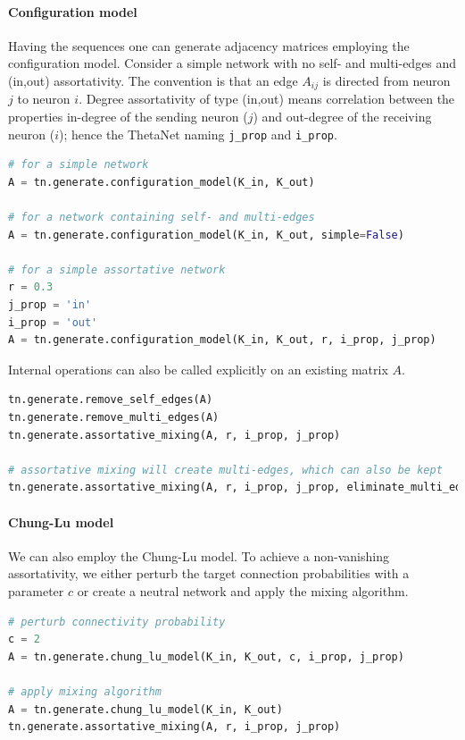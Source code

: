 \documentclass[bibliography=totoc, twoside]{article}
\numberwithin{equation}{section}
\begin{document}
\paragraph*{Configuration model}
Having the sequences one can generate adjacency matrices employing the configuration model.
Consider a simple network with no self- and multi-edges and (in,out) assortativity.
The convention is that an edge $A_{ij}$ is directed from neuron $j$ to neuron $i$.
Degree assortativity of type (in,out) means correlation between the properties in-degree of the sending neuron ($j$) and out-degree of the receiving neuron ($i$);
hence the ThetaNet naming \texttt{j\_prop} and \texttt{i\_prop}.
\begin{lstlisting}[language=python]
# for a simple network
A = tn.generate.configuration_model(K_in, K_out)

# for a network containing self- and multi-edges
A = tn.generate.configuration_model(K_in, K_out, simple=False)

# for a simple assortative network
r = 0.3
j_prop = 'in'
i_prop = 'out'
A = tn.generate.configuration_model(K_in, K_out, r, i_prop, j_prop)
\end{lstlisting}
Internal operations can also be called explicitly on an existing matrix $A$.
\begin{lstlisting}[language=python]
tn.generate.remove_self_edges(A)
tn.generate.remove_multi_edges(A)
tn.generate.assortative_mixing(A, r, i_prop, j_prop)

# assortative mixing will create multi-edges, which can also be kept
tn.generate.assortative_mixing(A, r, i_prop, j_prop, eliminate_multi_edges=False)
\end{lstlisting}

\paragraph*{Chung-Lu model}
We can also employ the Chung-Lu model.
To achieve a non-vanishing assortativity, we either perturb the target connection probabilities with a parameter $c$ or create a neutral network and apply the mixing algorithm.
\begin{lstlisting}[language=python]
# perturb connectivity probability
c = 2
A = tn.generate.chung_lu_model(K_in, K_out, c, i_prop, j_prop)

# apply mixing algorithm
A = tn.generate.chung_lu_model(K_in, K_out)
tn.generate.assortative_mixing(A, r, i_prop, j_prop)
\end{lstlisting}
\end{document}
